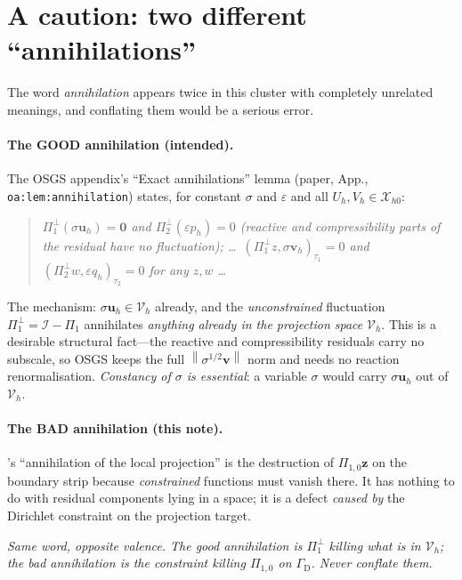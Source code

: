 \documentclass[11pt]{article}
\newcommand{\bu}{\boldsymbol{u}}
\newcommand{\bv}{\boldsymbol{v}}
\newcommand{\bz}{\boldsymbol{z}}
\newcommand{\norm}[1]{\left\lVert #1 \right\rVert}
\newcommand{\Xhz}{\mathcal{X}_{h0}}
\newcommand{\Vh}{\mathcal{V}_{h}}
\newcommand{\Pone}{\Pi_{1}}
\newcommand{\Ponez}{\Pi_{1,0}}
\newcommand{\Poneperp}{\Pi_{1}^{\perp}}
\newcommand{\Uh}{U_{h}}
\theoremstyle{plain}
\theoremstyle{definition}
\theoremstyle{remark}
\begin{document}
\section{A caution: two different ``annihilations''}\label{sec:annih}

The word \emph{annihilation} appears twice in this cluster with
completely unrelated meanings, and conflating them would be a serious
error.

\paragraph{The GOOD annihilation (intended).}
The OSGS appendix's ``Exact annihilations'' lemma (paper, App.,
\texttt{oa:lem:annihilation}) states, for constant $\sigma$ and
$\varepsilon$ and all $\Uh,V_h\in\Xhz$:
\begin{quote}\itshape
$\Pi_1^{\perp}(\sigma\bm u_h)=\bm 0$ and $\Pi_2^{\perp}(\varepsilon
p_h)=0$ (reactive and compressibility parts of the residual have no
fluctuation); \dots\ $(\Pi_1^{\perp}z,\sigma\bm v_h)_{\tau_1}=0$ and
$(\Pi_2^{\perp}w,\varepsilon q_h)_{\tau_2}=0$ for any $z,w$ \dots
\end{quote}
The mechanism: $\sigma\bu_h\in\Vh$ already, and the \emph{unconstrained}
fluctuation $\Poneperp=\mathcal I-\Pone$ annihilates \emph{anything
already in the projection space} $\Vh$. This is a desirable structural
fact---the reactive and compressibility residuals carry no subscale, so
OSGS keeps the full $\norm{\sigma^{1/2}\bv}$ norm and needs no reaction
renormalisation. \emph{Constancy of $\sigma$ is essential}: a variable
$\sigma$ would carry $\sigma\bu_h$ out of $\Vh$.

\paragraph{The BAD annihilation (this note).}
's ``annihilation of the local projection'' is the
destruction of $\Ponez\bz$ on the boundary strip because
\emph{constrained} functions must vanish there. It has nothing to do
with residual components lying in a space; it is a defect \emph{caused
by} the Dirichlet constraint on the projection target.

\begin{center}\itshape
Same word, opposite valence. The good annihilation is
$\Poneperp$ killing what is \emph{in} $\Vh$; the bad annihilation is the
\emph{constraint} killing $\Ponez$ on $\Gamma_{\mathrm D}$. Never
conflate them.
\end{center}
\end{document}

